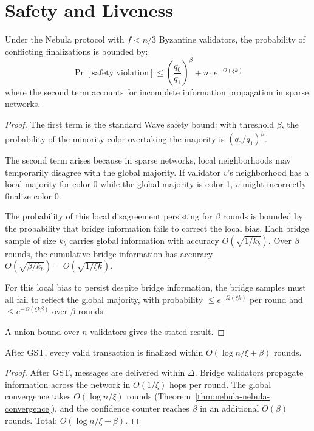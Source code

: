 \section{Safety and Liveness}

\label{sec:nebula-safety}

\begin{theorem}
\label{thm:nebula-nebula-safety}
Under the Nebula protocol with $f < n/3$ Byzantine validators, the probability of
conflicting finalizations is bounded by:
\[
\Pr[\text{safety violation}] \leq \left(\frac{q_0}{q_1}\right)^{\beta} + n \cdot e^{-\Omega(\xi k)}
\]
where the second term accounts for incomplete information propagation in sparse networks.
\end{theorem}

\begin{proof}
The first term is the standard Wave safety bound: with threshold $\beta$, the probability
of the minority color overtaking the majority is $(q_0/q_1)^\beta$.

The second term arises because in sparse networks, local neighborhoods may temporarily
disagree with the global majority. If validator $v$'s neighborhood has a local majority
for color 0 while the global majority is color 1, $v$ might incorrectly finalize color 0.

The probability of this local disagreement persisting for $\beta$ rounds is bounded by
the probability that bridge information fails to correct the local bias. Each bridge
sample of size $k_b$ carries global information with accuracy $O(\sqrt{1/k_b})$. Over
$\beta$ rounds, the cumulative bridge information has accuracy $O(\sqrt{\beta / k_b}) = O(\sqrt{1/\xi k})$.

For this local bias to persist despite bridge information, the bridge samples must
all fail to reflect the global majority, with probability $\leq e^{-\Omega(\xi k)}$ per
round and $\leq e^{-\Omega(\xi k \beta)}$ over $\beta$ rounds.

A union bound over $n$ validators gives the stated result.
\end{proof}

\begin{lemma}
\label{lem:nebula-nebula-liveness}
After GST, every valid transaction is finalized within $O(\log n / \xi + \beta)$ rounds.
\end{lemma}

\begin{proof}
After GST, messages are delivered within $\Delta$. Bridge validators propagate
information across the network in $O(1/\xi)$ hops per round. The global convergence
takes $O(\log n / \xi)$ rounds (Theorem~\ref{thm:nebula-nebula-convergence}), and the
confidence counter reaches $\beta$ in an additional $O(\beta)$ rounds. Total:
$O(\log n / \xi + \beta)$.
\end{proof}


